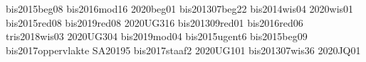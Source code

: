 bis2015beg08
bis2016mod16
2020beg01
bis201307beg22
bis2014wis04
2020wis01
bis2015red08
bis2019red08
2020UG316
bis201309red01
bis2016red06
tris2018wis03
2020UG304
bis2019mod04
bis2015ugent6
bis2015beg09
bis2017oppervlakte
SA20195
bis2017staaf2
2020UG101
bis201307wis36
2020JQ01
